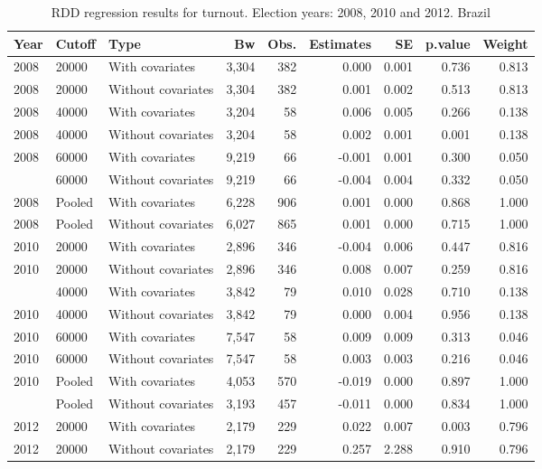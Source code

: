 \documentclass[12pt,]{article}
\begin{document}
\begin{table}[!h]

\caption{\label{tab:reg.part}RDD regression results for turnout. Election years: 2008, 2010 and 2012. Brazil}
\centering
\begin{tabular}{lllrrrrrr}
\toprule
Year & Cutoff & Type & Bw & Obs. & Estimates & SE & p.value & Weight\\
\midrule
2008 & 20000 & With covariates & 3,304 & 382 & 0.000 & 0.001 & 0.736 & 0.813\\
2008 & 20000 & Without covariates & 3,304 & 382 & 0.001 & 0.002 & 0.513 & 0.813\\
2008 & 40000 & With covariates & 3,204 & 58 & 0.006 & 0.005 & 0.266 & 0.138\\
2008 & 40000 & Without covariates & 3,204 & 58 & 0.002 & 0.001 & 0.001 & 0.138\\
2008 & 60000 & With covariates & 9,219 & 66 & -0.001 & 0.001 & 0.300 & 0.050\\
\addlinespace
2008 & 60000 & Without covariates & 9,219 & 66 & -0.004 & 0.004 & 0.332 & 0.050\\
2008 & Pooled & With covariates & 6,228 & 906 & 0.001 & 0.000 & 0.868 & 1.000\\
2008 & Pooled & Without covariates & 6,027 & 865 & 0.001 & 0.000 & 0.715 & 1.000\\
2010 & 20000 & With covariates & 2,896 & 346 & -0.004 & 0.006 & 0.447 & 0.816\\
2010 & 20000 & Without covariates & 2,896 & 346 & 0.008 & 0.007 & 0.259 & 0.816\\
\addlinespace
2010 & 40000 & With covariates & 3,842 & 79 & 0.010 & 0.028 & 0.710 & 0.138\\
2010 & 40000 & Without covariates & 3,842 & 79 & 0.000 & 0.004 & 0.956 & 0.138\\
2010 & 60000 & With covariates & 7,547 & 58 & 0.009 & 0.009 & 0.313 & 0.046\\
2010 & 60000 & Without covariates & 7,547 & 58 & 0.003 & 0.003 & 0.216 & 0.046\\
2010 & Pooled & With covariates & 4,053 & 570 & -0.019 & 0.000 & 0.897 & 1.000\\
\addlinespace
2010 & Pooled & Without covariates & 3,193 & 457 & -0.011 & 0.000 & 0.834 & 1.000\\
2012 & 20000 & With covariates & 2,179 & 229 & 0.022 & 0.007 & 0.003 & 0.796\\
2012 & 20000 & Without covariates & 2,179 & 229 & 0.257 & 2.288 & 0.910 & 0.796\\

\end{tabular}
\end{table}
\end{document}
